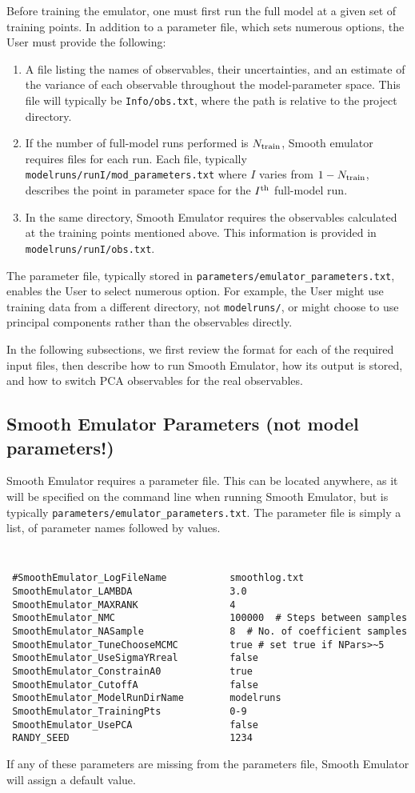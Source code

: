\documentclass[main.tex]{subfiles}
\begin{document}
Before training the emulator, one must first run the full model at a given set of training points. In addition to a parameter file, which sets numerous options, the User must provide the following:
\begin{enumerate}\itemsep=0pt
    \item A file listing the names of observables, their uncertainties, and an estimate of the variance of each observable throughout the model-parameter space. This file will typically be {\tt Info/obs.txt}, where the path is relative to the project directory. 
    \item If the number of full-model runs performed is $N_{\rm train}$, Smooth emulator requires files for each run. Each file, typically {\tt modelruns/runI/mod\_parameters.txt} where $I$ varies from $1-N_{\rm train}$, describes the point in  parameter space for the $I^{\rm th}$ full-model run. 
    \item In the same directory, Smooth Emulator requires the observables calculated at the training points mentioned above. This information is provided in {\tt modelruns/runI/obs.txt}. 
\end{enumerate}
The parameter file, typically stored in {\tt parameters/emulator\_parameters.txt}, enables the User to select numerous option. For example, the User might use training data from a different directory, not {\tt modelruns/}, or might choose to use principal components rather than the observables directly. 

In the following subsections, we first review the format for each of the required input files, then describe how to run Smooth Emulator, how its output is stored, and how to switch PCA observables for the real observables.

\subsection{Smooth Emulator Parameters (not model parameters!)}

Smooth Emulator requires a parameter file. This can be located anywhere, as it will be specified on the command line when running Smooth Emulator, but is typically {\tt parameters/emulator\_parameters.txt}. The parameter file is simply a list, of parameter names followed by values. 

{\tt
\begin{verbatim}
 #SmoothEmulator_LogFileName           smoothlog.txt
 SmoothEmulator_LAMBDA                 3.0
 SmoothEmulator_MAXRANK                4
 SmoothEmulator_NMC                    100000  # Steps between samples 
 SmoothEmulator_NASample               8  # No. of coefficient samples
 SmoothEmulator_TuneChooseMCMC         true # set true if NPars>~5
 SmoothEmulator_UseSigmaYRreal         false 
 SmoothEmulator_ConstrainA0            true
 SmoothEmulator_CutoffA                false
 SmoothEmulator_ModelRunDirName        modelruns
 SmoothEmulator_TrainingPts            0-9
 SmoothEmulator_UsePCA                 false
 RANDY_SEED                            1234
\end{verbatim}
}
If any of these parameters are missing from the parameters file, Smooth Emulator will assign a default value.
\end{document}
